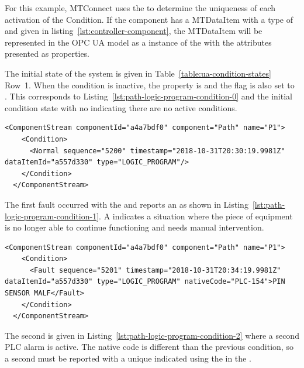 For this example, MTConnect uses the  to determine the uniqueness of each activation of the Condition. If the  component has a \gls{MTDataItem} with a \gls{type} of  and given in listing~\ref{lst:controller-component}, the \gls{MTDataItem} will be represented in the OPC UA model as a instance of the  with the attributes presented as properties.

The initial state of the system is given in Table~\ref{table:ua-condition-states} Row~1. When the condition is inactive, the  property is  and the  flag is also set to . This corresponds to Listing~\ref{lst:path-logic-program-condition-0} and the  initial condition state with no  indicating there are no active conditions.

\begin{lstlisting}[firstnumber=1,escapechar=|,%
    caption={Path Logic Program Initial Normal State},label={lst:path-logic-program-condition-0}]
  <ComponentStream componentId="a4a7bdf0" component="Path" name="P1">
    <Condition>
      <Normal sequence="5200" timestamp="2018-10-31T20:30:19.9981Z" dataItemId="a557d330" type="LOGIC_PROGRAM"/>
    </Condition>
  </ComponentStream>
\end{lstlisting}

The first fault occurred with the   and reports an   as shown in Listing~\ref{lst:path-logic-program-condition-1}. A  indicates a situation where the piece of equipment is no longer able to continue functioning and needs manual intervention.

\begin{lstlisting}[firstnumber=last,escapechar=|,%
    caption={Path Logic Program First Fault PLC-154},label={lst:path-logic-program-condition-1}]
  <ComponentStream componentId="a4a7bdf0" component="Path" name="P1">
    <Condition>
      <Fault sequence="5201" timestamp="2018-10-31T20:34:19.9981Z" dataItemId="a557d330" type="LOGIC_PROGRAM" nativeCode="PLC-154">PIN SENSOR MALF</Fault>
    </Condition>
  </ComponentStream>
\end{lstlisting}

The second  is given in Listing~\ref{lst:path-logic-program-condition-2} where a second PLC alarm is active. The native code is different than the previous condition, so a second  must be reported with a unique  indicated using the  in the . 

